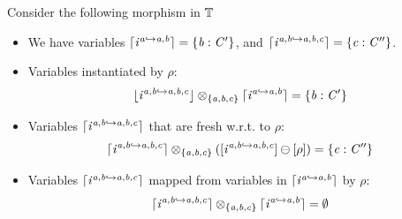 \begin{example}\label{ex:tempC-overview}
    Consider the following morphism in $\tempC$
    \begin{center}
    \end{center}
    \begin{itemize}
        \item We have variables $\varL{\incl^{\va \inclto \va,\vb}} = \{ \vb : \vC' \}$, and $\varL{\incl^{\va,\vb \inclto \va,\vb,\vc}} = \{ \vc : \vC''\}$.
        \item Variables instantiated by $\rho$: 
                \[\concL{\incl^{\va,\vb \inclto \va,\vb,\vc}} \pltimes{\{ \va, \vb, \vc \}} \varL{\incl^{\va \inclto \va,\vb}} = \{ \vb : \vC' \} \]
        \item Variables $\varL{\incl^{\va,\vb \inclto \va,\vb,\vc}}$ that are fresh w.r.t. to $\rho$: 
                \[ \varL{\incl^{\va,\vb \inclto \va,\vb,\vc}} \pltimes{\{ \va,\vb,\vc\}} (\anyL{\incl^{\va,\vb \inclto \va,\vb,\vc}} \ominus \anyL\rho) = \{ \vc : \vC''\} \]
        \item Variables $\varL{\incl^{\va,\vb \inclto \va,\vb,\vc}}$ mapped from variables in $\varL{\incl^{\va \inclto \va,\vb}}$ by $\rho$: 
                \[ \varL{\incl^{\va,\vb \inclto \va,\vb,\vc}} \pltimes{\{ \va,\vb,\vc\}} \varL{\incl^{\va \inclto \va,\vb}} = \emptyset \]
    \end{itemize}
\end{example}

